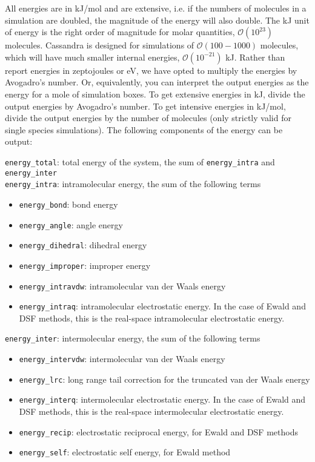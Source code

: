 All energies are in kJ/mol and are extensive, i.e.
if the numbers of molecules in a simulation are doubled, the magnitude of the energy will also double.
The kJ unit of energy is the right order of magnitude for molar quantities, $\mathcal{O}(10^{23})$ molecules.
Cassandra is designed for simulations of $\mathcal{O}(100-1000)$ molecules,
which will have much smaller internal energies, $\mathcal{O}(10^{-21})$ kJ.
Rather than report energies in zeptojoules or eV, we have opted to multiply the energies by Avogadro's number.
Or, equivalently, you can interpret the output energies as the energy for a mole of simulation boxes.
To get extensive energies in kJ, divide the output energies by Avogadro's number.
To get intensive energies in kJ/mol, divide the output energies by the number of molecules 
(only strictly valid for single species simulations).
The following components of the energy can be output:

\texttt{energy\_total}: total energy of the system, the sum of \texttt{energy\_intra} and \texttt{energy\_inter} \\
\texttt{energy\_intra}: intramolecular energy, the sum of the following terms
\begin{itemize}
\item \texttt{energy\_bond}: bond energy
\item \texttt{energy\_angle}: angle energy
\item \texttt{energy\_dihedral}: dihedral energy
\item \texttt{energy\_improper}: improper energy
\item \texttt{energy\_intravdw}: intramolecular van der Waals energy
\item \texttt{energy\_intraq}: intramolecular electrostatic energy. 
In the case of Ewald and DSF methods, this is the real-space intramolecular electrostatic energy.
\end{itemize}
\texttt{energy\_inter}: intermolecular energy, the sum of the following terms
\begin{itemize}
\item \texttt{energy\_intervdw}: intermolecular van der Waals energy
\item \texttt{energy\_lrc}: long range tail correction for the truncated van der Waals energy
\item \texttt{energy\_interq}: intermolecular electrostatic energy. 
In the case of Ewald and DSF methods, this is the real-space intermolecular electrostatic energy.
\item \texttt{energy\_recip}: electrostatic reciprocal energy, for Ewald and DSF methods
\item \texttt{energy\_self}: electrostatic self energy, for Ewald method
\end{itemize}

